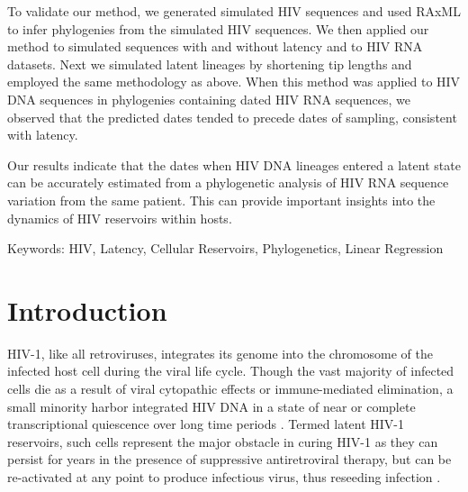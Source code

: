 \documentclass[12pt]{article}
\begin{document}
To validate our method, we generated simulated HIV sequences and used RAxML to infer phylogenies from the simulated HIV sequences.
We then applied our method to simulated sequences with and without latency and to HIV RNA datasets.
Next we simulated latent lineages by shortening tip lengths and employed the same methodology as above.
When this method was applied to HIV DNA sequences in phylogenies containing dated HIV RNA sequences, we observed that the predicted dates tended to precede dates of sampling, consistent with latency.

Our results indicate that the dates when HIV DNA lineages entered a latent state can be accurately estimated from a phylogenetic analysis of HIV RNA sequence variation from the same patient.
This can provide important insights into the dynamics of HIV reservoirs within hosts.


Keywords: 
HIV, Latency, Cellular Reservoirs, Phylogenetics, Linear Regression\\



\underline{}
\section * {Introduction} \label{sec:intro}

HIV-1, like all retroviruses, integrates its genome into the chromosome of the infected host cell during the viral life cycle.
Though the vast majority of infected cells die as a result of viral cytopathic effects or immune-mediated elimination, a small minority \citep[broadly estimated as one in every million resting CD4+ T-cells;][]{Chun97,Finzi97} harbor integrated HIV DNA in a state of near or complete transcriptional quiescence over long time periods \citep{Archin14,Pace11,Richman09}.
Termed latent HIV-1 reservoirs, such cells represent the major obstacle in curing HIV-1 as they can persist for years in the presence of suppressive antiretroviral therapy, but can be re-activated at any point to produce infectious virus, thus reseeding infection \citep{Durand12,Joos08,Katlama13,Pomerantz03,Shen08,Richman09}. 
\end{document}

